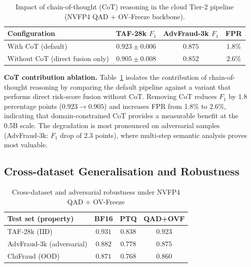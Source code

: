 \documentclass[lettersize,journal]{IEEEtran}
\begin{document}
\begin{table}[!t]
\centering
\caption{Impact of chain-of-thought (CoT) reasoning in the cloud Tier-2 pipeline (NVFP4 QAD + OV-Freeze backbone).}
\label{tab:cot-ablation-en}
\small
\renewcommand{\arraystretch}{1.2}
\begin{tabular}{lccc}
\toprule
\textbf{Configuration} & \textbf{TAF-28k $F_1$} & \textbf{AdvFraud-3k $F_1$} & \textbf{FPR} \\
\midrule
With CoT (default) & $\mathbf{0.923 \pm 0.006}$ & $\mathbf{0.875}$ & $\mathbf{1.8\%}$ \\
Without CoT (direct fusion only) & $0.905 \pm 0.008$ & $0.852$ & $2.6\%$ \\
\bottomrule
\end{tabular}
\end{table}

\medskip
\noindent\textbf{CoT contribution ablation.} Table~\ref{tab:cot-ablation-en} isolates the contribution of chain-of-thought reasoning by comparing the default pipeline against a variant that performs direct risk-score fusion without CoT. Removing CoT reduces $F_1$ by 1.8 percentage points ($0.923\!\rightarrow\!0.905$) and increases FPR from 1.8\% to 2.6\%, indicating that domain-constrained CoT provides a measurable benefit at the 0.5B scale. The degradation is most pronounced on adversarial samples (AdvFraud-3k: $F_1$ drop of 2.3 points), where multi-step semantic analysis proves most valuable.

\subsection{Cross-dataset Generalisation and Robustness}

\begin{table}[!t]
\centering
\caption{Cross-dataset and adversarial robustness under NVFP4 QAD + OV-Freeze}
\label{tab4-cross-en}
\small
\renewcommand{\arraystretch}{1.15}
\begin{tabular}{lccc}
\toprule
\textbf{Test set (property)} & \textbf{BF16} & \textbf{PTQ} & \textbf{QAD+OVF} \\
\midrule
TAF-28k (IID) & $0.931$ & $0.838$ & $\mathbf{0.923}$ \\
AdvFraud-3k (adversarial) & $0.882$ & $0.778$ & $\mathbf{0.875}$ \\
ChiFraud (OOD) & $0.871$ & $0.768$ & $\mathbf{0.860}$ \\
\bottomrule
\end{tabular}
\end{table}
\end{document}
